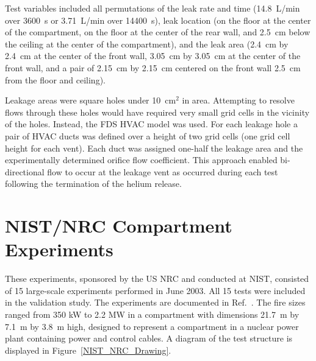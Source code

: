 Test variables included all permutations of the leak rate and time (14.8~L/min over 3600~s or 3.71~L/min over 14400~s), leak location (on the floor at the center of the compartment, on the floor at the center of the rear wall, and 2.5~cm below the ceiling at the center of the compartment), and the leak area (2.4~cm by 2.4~cm at the center of the front wall, 3.05~cm by 3.05~cm at the center of the front wall, and a pair of 2.15~cm by 2.15~cm centered on the front wall 2.5~cm from the floor and ceiling).

Leakage areas were square holes under 10~cm$^2$ in area.  Attempting to resolve flows through these holes would have required very small grid cells in the vicinity of the holes.  Instead, the FDS HVAC model was used.  For each leakage hole a pair of HVAC ducts was defined over a height of two grid cells (one grid cell height for each vent).  Each duct was assigned one-half the leakage area and the experimentally determined orifice flow coefficient. This approach enabled bi-directional flow to occur at the leakage vent as occurred during each test following the termination of the helium release.



\section{NIST/NRC Compartment Experiments}

These experiments, sponsored by the US NRC and conducted at NIST, consisted of 15 large-scale experiments performed in June 2003. All 15 tests were included in the validation study. The experiments are documented in Ref.~\cite{Hamins:SP1013-1}. The fire sizes ranged from 350 kW to 2.2 MW in a compartment with dimensions 21.7~m by 7.1~m by 3.8~m high, designed to represent a compartment in a nuclear power plant containing power and control cables. A diagram of the test structure is displayed in Figure~\ref{NIST_NRC_Drawing}.

